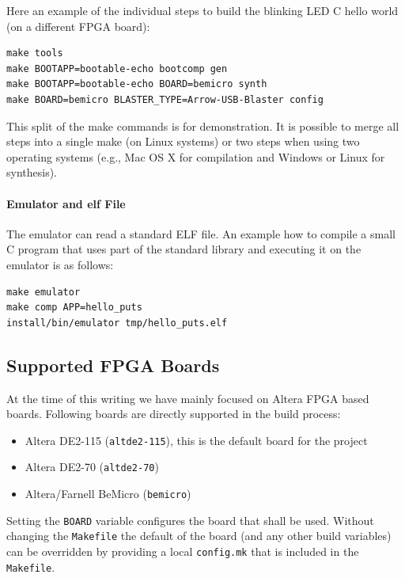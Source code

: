\documentclass[a4paper,fontsize=10pt,twoside,DIV15,BCOR12mm,headinclude=true,footinclude=false,pagesize,bibtotoc]{scrbook}
\newcommand{\code}[1]{{\texttt{#1}}}
\newcommand{\comment}[3]{

\textsf{\textbf{#1}} {\color{#3}#2}}
\newcommand{\martin}[1]{\comment{Martin}{#1}{Blue}}
\renewcommand{\martin}[1]{}
\begin{document}
Here an example of the individual steps to build the blinking LED C
hello world (on a different FPGA board):
\begin{verbatim}
make tools
make BOOTAPP=bootable-echo bootcomp gen
make BOOTAPP=bootable-echo BOARD=bemicro synth
make BOARD=bemicro BLASTER_TYPE=Arrow-USB-Blaster config
\end{verbatim}

This split of the make commands is for demonstration. It is
possible to merge all steps into a single make (on Linux
systems) or two steps when using two operating
systems (e.g., Mac OS X for compilation and Windows or Linux for synthesis).

\paragraph{Emulator and elf File}

The emulator can read a standard ELF file. An example how to compile
a small C program that uses part of the standard library and executing
it on the emulator is as follows:

\begin{verbatim}
make emulator
make comp APP=hello_puts
install/bin/emulator tmp/hello_puts.elf
\end{verbatim}

\martin{Where is the make target to run the emulator with an ELF file?}

\subsection{Supported FPGA Boards}

At the time of this writing we have mainly focused on Altera FPGA based boards. Following boards
are directly supported in the build process:

\begin{itemize}
\item Altera DE2-115 (\code{altde2-115}), this is the default board for the project
\item Altera DE2-70 (\code{altde2-70})
\item Altera/Farnell BeMicro (\code{bemicro})
\end{itemize}

Setting the \code{BOARD} variable configures the board that shall be used.
Without changing the \code{Makefile} the default of the board (and any other build variables)
can be overridden by providing a local \code{config.mk} that is included in the \code{Makefile}.
\end{document}
